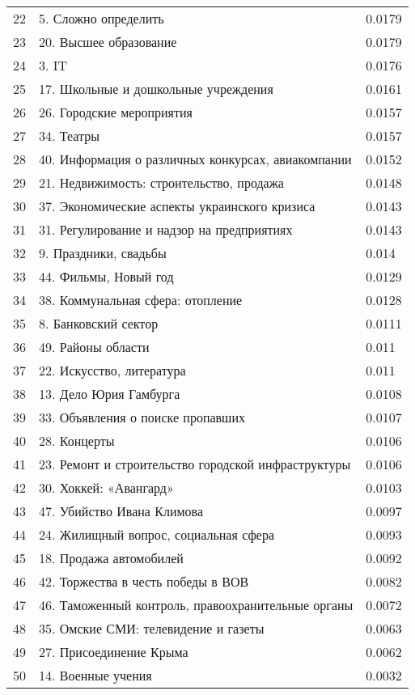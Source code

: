 \begin{longtable}[c]{| L{3cm} | C{7cm} | R{5cm} |}
		22 & 5. Сложно определить & 0.0179 \\
		23 & 20. Высшее образование & 0.0179 \\
		24 & 3. IT & 0.0176 \\
		25 & 17. Школьные и дошкольные учреждения & 0.0161 \\
		26 & 26. Городские мероприятия & 0.0157 \\
		27 & 34. Театры & 0.0157 \\
		28 & 40. Информация о различных конкурсах, авиакомпании & 0.0152 \\
		29 & 21. Недвижимость: строительство, продажа & 0.0148 \\
		30 & 37. Экономические аспекты украинского кризиса & 0.0143 \\
		31 & 31. Регулирование и надзор на предприятиях & 0.0143 \\
		32 & 9. Праздники, свадьбы & 0.014 \\
		33 & 44. Фильмы, Новый год & 0.0129 \\
		34 & 38. Коммунальная сфера: отопление & 0.0128 \\
		35 & 8. Банковский сектор & 0.0111 \\
		36 & 49. Районы области & 0.011 \\
		37 & 22. Искусство, литература & 0.011 \\
		38 & 13. Дело Юрия Гамбурга & 0.0108 \\
		39 & 33. Объявления о поиске пропавших & 0.0107 \\
		40 & 28. Концерты & 0.0106 \\
		41 & 23. Ремонт и строительство городской инфраструктуры & 0.0106 \\
		42 & 30. Хоккей: «Авангард» & 0.0103 \\
		43 & 47. Убийство Ивана Климова & 0.0097 \\
		44 & 24. Жилищный вопрос, социальная сфера & 0.0093 \\
		45 & 18. Продажа автомобилей & 0.0092 \\
		46 & 42. Торжества в честь победы в ВОВ & 0.0082 \\
		47 & 46. Таможенный контроль, правоохранительные органы & 0.0072 \\
		48 & 35. Омские СМИ: телевидение и газеты & 0.0063 \\
		49 & 27. Присоединение Крыма & 0.0062 \\
		50 & 14. Военные учения & 0.0032 \\
	\hline
\end{longtable}

